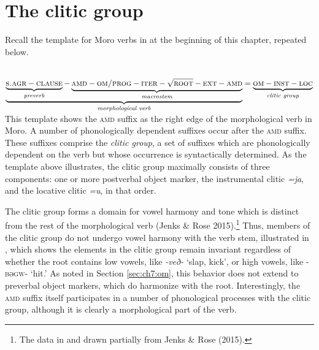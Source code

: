 \section{The clitic group}\label{sec:ch11:clitic}

Recall the template for Moro verbs in  at the beginning of this chapter, repeated below.

\\ 
$\underbrace{\underbrace{\textsc{s.agr} - \textsc{clause}}_\textit{preverb}-  \underbrace{\textsc{amd} - \textsc{om/prog} - \textsc{iter} - \sqrt{\textsc{root}} - \textsc{ext} - \textsc{amd}}_\textit{macrostem}}_\textit{morphological verb}= \underbrace{\textsc{om}-\textsc{inst}-\textsc{loc}}_\textit{clitic group}$
\z 
This template shows the \textsc{amd} suffix as the right edge of the morphological verb in Moro. A number of phonologically dependent suffixes occur after the \textsc{amd} suffix. These suffixes comprise the \textit{clitic group}, a set of suffixes which are phonologically dependent on the verb but whose occurrence is syntactically determined. As the template above illustrates, the clitic group maximally consists of three components: one or more postverbal object marker, the instrumental clitic \textit{=ja}, and the locative clitic \textit{=u}, in that order.

The clitic group forms a domain for vowel harmony and tone which is distinct from the rest of the morphological verb (Jenks \& Rose 2015).\footnote{The data in  and  drawn partially from Jenks \& Rose (2015).} Thus, members of the clitic group do not undergo vowel harmony with the verb stem, illustrated in , which shows the elements in the clitic group remain invariant regardless of whether the root contains low vowels, like \textit{-veð-} `slap, kick', or high vowels, like \textsc{-bəgw-} `hit.' As noted in Section \ref{sec:ch7:om}, this behavior does not extend to preverbal object markers, which do harmonize with the root. Interestingly, the \textsc{amd} suffix itself participates in a number of phonological processes with the clitic group, although it is clearly a morphological part of the verb.

